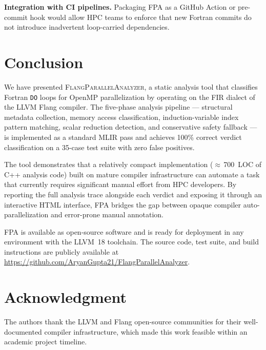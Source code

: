 \documentclass[conference]{IEEEtran}
\begin{document}
\textbf{Integration with CI pipelines.}
Packaging FPA as a GitHub Action or pre-commit hook would allow HPC
teams to enforce that new Fortran commits do not introduce inadvertent
loop-carried dependencies.

\section{Conclusion}
\label{sec:conclusion}

We have presented \textsc{FlangParallelAnalyzer}, a static analysis
tool that classifies Fortran \texttt{DO} loops for OpenMP
parallelization by operating on the FIR dialect of the LLVM Flang
compiler.  The five-phase analysis pipeline — structural metadata
collection, memory access classification, induction-variable index
pattern matching, scalar reduction detection, and conservative safety
fallback — is implemented as a standard MLIR pass and achieves 100\%
correct verdict classification on a 35-case test suite with zero false
positives.

The tool demonstrates that a relatively compact implementation
($\approx$\,700~LOC of C++ analysis code) built on mature compiler
infrastructure can automate a task that currently requires significant
manual effort from HPC developers.  By reporting the full
analysis trace alongside each verdict and exposing it through an
interactive HTML interface, FPA bridges the gap between opaque
compiler auto-parallelization and error-prone manual annotation.

FPA is available as open-source software and is ready for deployment
in any environment with the LLVM~18 toolchain.  The source code,
test suite, and build instructions are publicly available at
\url{https://github.com/AryanGupta21/FlangParallelAnalyzer}.

\section*{Acknowledgment}

The authors thank the LLVM and Flang open-source communities for
their well-documented compiler infrastructure, which made this work
feasible within an academic project timeline.
\end{document}
